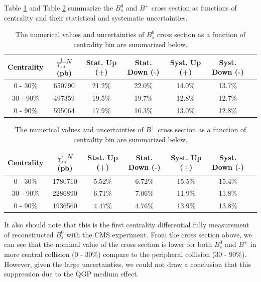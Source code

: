 Table \ref{BsXsectCent} and Table \ref{BPXsectCent} summarize the $B^0_s$ and $B^+$ cross section as functions of centrality and their statistical and systematic uncertainties.




\begin{table}[h]
\begin{center}
\caption{The numerical values and uncertainties of $B^0_s$ cross section as a function of centrality bin are summarized below.}
\vspace{1em}
\label{BsXsectCent}
  \begin{tabular}{| c | c |c | c| c| c| c|}
    \hline
Centrality &  $\frac{1}{T_{AA}} N$ (pb) & Stat. Up (+)   & Stat. Down (-)  &  Syst. Up (+)  &  Syst. Down (-) \\
    \hline
    \hline
0 - 30\% &   650790  &  21.2\% & 22.0\% & 14.0\% & 13.7\% \\ 
30 - 90\%  & 497359  & 19.5\%  & 19.7\%  & 12.8\% & 12.7\% \\ 
0 - 90\% &  595064 & 17.9\%   &  16.3\% & 13.0\% & 12.8\% \\ 
    \hline
    \hline
\end{tabular}
\end{center}
\end{table}


\begin{table}[h]
\begin{center}
\caption{The numerical values and uncertainties of $B^+$ cross section as a function of centrality bin are summarized below.}
\vspace{1em}
\label{BPXsectCent}
  \begin{tabular}{| c | c |c | c| c| c| c|}
    \hline
Centrality &  $\frac{1}{T_{AA}} N$ (pb) & Stat. Up (+)   & Stat. Down (-)  &  Syst. Up (+)  &  Syst. Down (-) \\
    \hline
    \hline
0 - 30\% &   1780710  &  5.52\% & 6.72\% & 15.5\% & 15.4\% \\ 
30 - 90\%  & 2286890  & 6.71\%  & 7.06\%  & 11.9\% & 11.8\% \\ 
0 - 90\% &  1936560 & 4.47\%   &  4.76\% & 13.9\% & 13.8\% \\ 
    \hline
    \hline
\end{tabular}
\end{center}
\end{table}



It also should note that this is the first centrality differential fully measurement of reconstructed $B^0_s$ with the CMS experiment. From the cross section above, we can see that the nominal value of the cross section is lower for both $B^0_s$ and $B^+$ in more central collision (0 - 30\%) compare to the peripheral collision (30 - 90\%). However, given the large uncertainties, we could not draw a conclusion that this suppression due to the QGP medium effect.






